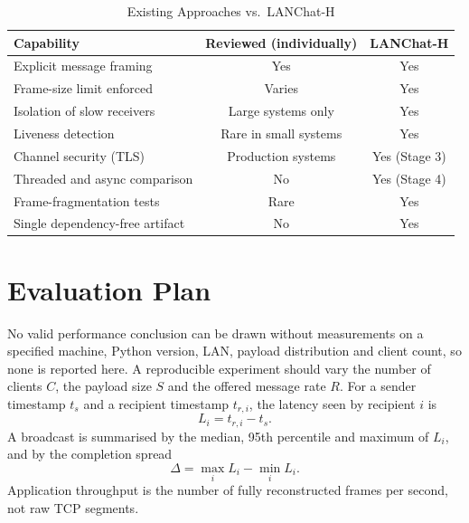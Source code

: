 \documentclass[conference]{IEEEtran}
\begin{document}
\begin{table}[t]
\centering
\caption{Existing Approaches vs.\ LANChat-H}
\label{tab:existing}
\footnotesize
\begin{tabularx}{\columnwidth}{@{}Y c c@{}}
\toprule
\textbf{Capability} & \textbf{Reviewed (individually)} & \textbf{LANChat-H} \\
\midrule
Explicit message framing & Yes & Yes \\
Frame-size limit enforced & Varies & Yes \\
Isolation of slow receivers & Large systems only & Yes \\
Liveness detection & Rare in small systems & Yes \\
Channel security (TLS) & Production systems & Yes (Stage 3) \\
Threaded and async comparison & No & Yes (Stage 4) \\
Frame-fragmentation tests & Rare & Yes \\
Single dependency-free artifact & No & Yes \\
\bottomrule
\end{tabularx}
\end{table}

\section{Evaluation Plan}
No valid performance conclusion can be drawn without measurements on a specified machine, Python version, LAN, payload distribution and client count, so none is reported here. A reproducible experiment should vary the number of clients $C$, the payload size $S$ and the offered message rate $R$. For a sender timestamp $t_s$ and a recipient timestamp $t_{r,i}$, the latency seen by recipient $i$ is
\begin{equation}
L_i = t_{r,i} - t_s .
\end{equation}
A broadcast is summarised by the median, 95th percentile and maximum of $L_i$, and by the completion spread
\begin{equation}
\Delta = \max_i L_i - \min_i L_i .
\end{equation}
Application throughput is the number of fully reconstructed frames per second, not raw TCP segments.
\end{document}
